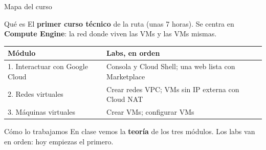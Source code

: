 \documentclass[aspectratio=169,10pt,c]{beamer}
\begin{document}
\begin{frame}{Mapa del curso}
\begin{block}{Qué es}
\small El \textbf{primer curso técnico} de la ruta (unas 7 horas). Se centra en \textbf{Compute Engine}: la red donde viven las VMs y las VMs mismas.
\end{block}
\renewcommand{\arraystretch}{1.3}
\centering\small
\begin{tabular}{@{}p{4.8cm}p{7.8cm}@{}}
\toprule
\textbf{Módulo} & \textbf{Labs, en orden}\\
\midrule
1. Interactuar con Google Cloud & Consola y Cloud Shell; una web lista con Marketplace\\
2. Redes virtuales & Crear redes VPC; VMs sin IP externa con Cloud NAT\\
3. Máquinas virtuales & Crear VMs; configurar VMs\\
\bottomrule
\end{tabular}
\par\vspace{3mm}
\begin{alertblock}{Cómo lo trabajamos}
\small En clase vemos la \textbf{teoría} de los tres módulos. Los labs van en orden: hoy empiezas el primero.
\end{alertblock}
\end{frame}
\end{document}
